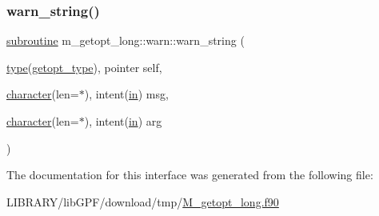 \mbox{\label{interfacem__getopt__long_1_1warn_a37d158a750e57e3aab62c50d9de4f353}} 
\subsubsection{\texorpdfstring{warn\+\_\+string()}{warn\_string()}}
{\footnotesize\ttfamily \hyperlink{M__stopwatch_83_8txt_acfbcff50169d691ff02d4a123ed70482}{subroutine} m\+\_\+getopt\+\_\+long\+::warn\+::warn\+\_\+string (\begin{DoxyParamCaption}\item[{\hyperlink{stop__watch_83_8txt_a70f0ead91c32e25323c03265aa302c1c}{type}(\hyperlink{structm__getopt__long_1_1getopt__type}{getopt\+\_\+type}), pointer}]{self,  }\item[{\hyperlink{option__stopwatch_83_8txt_abd4b21fbbd175834027b5224bfe97e66}{character}(len=$\ast$), intent(\hyperlink{M__journal_83_8txt_afce72651d1eed785a2132bee863b2f38}{in})}]{msg,  }\item[{\hyperlink{option__stopwatch_83_8txt_abd4b21fbbd175834027b5224bfe97e66}{character}(len=$\ast$), intent(\hyperlink{M__journal_83_8txt_afce72651d1eed785a2132bee863b2f38}{in})}]{arg }\end{DoxyParamCaption})}



The documentation for this interface was generated from the following file\+:\begin{DoxyCompactItemize}
\item 
L\+I\+B\+R\+A\+R\+Y/lib\+G\+P\+F/download/tmp/\hyperlink{M__getopt__long_8f90}{M\+\_\+getopt\+\_\+long.\+f90}\end{DoxyCompactItemize}
